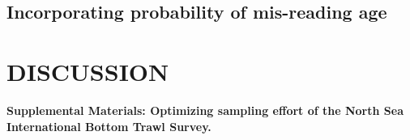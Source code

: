 \documentclass[a4paper 12pt]{article}
\numberwithin{equation}{section}
\renewcommand{\theequation} {\arabic{section}.\arabic{equation}}
\begin{document}
\clearpage
\subsection{Incorporating probability of mis-reading age}



\clearpage
\section{DISCUSSION}
\label{sec:discussion}

\clearpage







\clearpage




\clearpage


\begin{center}
\textbf{\Large Supplemental Materials: Optimizing sampling effort of the North Sea International Bottom Trawl Survey.}
\end{center}
\setcounter{section}{0}
\setcounter{equation}{0}
\setcounter{figure}{0}
\setcounter{table}{0}
\setcounter{page}{1}
\makeatletter
\renewcommand{\thesection}{S\arabic{section}}
\renewcommand{\theequation}{S\arabic{section}.\arabic{equation}}
\renewcommand{\thefigure}{S\arabic{figure}}
\renewcommand{\bibnumfmt}[1]{[S#1]}
\renewcommand{\citenumfont}[1]{S#1}
\end{document}
